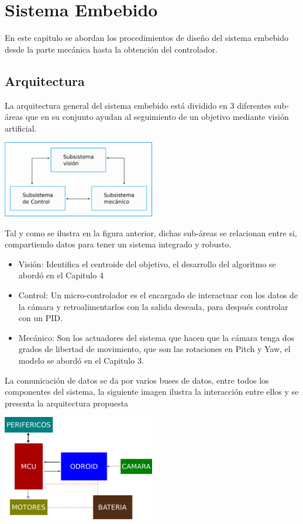 \chapter{Sistema Embebido}

En este capitulo se abordan los procedimientos de diseño del sistema embebido desde la parte mecánica hasta la
obtención del controlador.

\section{Arquitectura}
La arquitectura general del sistema embebido está dividido en 3 diferentes sub-áreas que en su conjunto ayudan al
seguimiento de un objetivo mediante visión artificial.
\begin{center}
	\includegraphics[width=0.5\textwidth]{Contenido/Cuerpo/Capitulo5/Fig12.eps}
	\label{Fig1}
\end{center}
Tal y como se ilustra en la figura anterior, dichas sub-áreas se relacionan entre si, compartiendo datos para tener un
sistema integrado y robusto.
\begin{itemize}
	\item Visión: Identifica el centroide del objetivo, el desarrollo del algoritmo se abordó en el Capitulo 4
	\item Control: Un micro-controlador es el encargado de interactuar con los datos de la cámara y retroalimentarlos con la
	      salida deseada, para después controlar con un PID.
	\item Mecánico: Son los actuadores del sistema que hacen que la cámara tenga dos grados de libertad de movimiento, que
	      son las rotaciones en Pitch y Yaw, el modelo se abordó en el Capitulo 3.
\end{itemize}
La comunicación de datos se da por varios buses de datos, entre todos los componentes del sistema, la siguiente imagen ilustra
la interacción entre ellos y se presenta la arquitectura propuesta
\begin{center}
	\includegraphics[width=0.5\textwidth]{Contenido/Cuerpo/Capitulo5/Fig13.eps}
	\label{Fig1}
\end{center}
